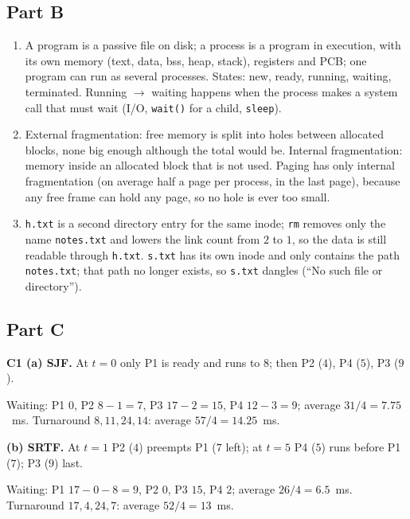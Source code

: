 \documentclass[11pt,a4paper]{article}
\newcommand{\cmd}[1]{\texttt{#1}}
\begin{document}
\subsection*{Part B}
\begin{enumerate}[leftmargin=1.6em,label=B\arabic*.]
  \item A program is a passive file on disk; a process is a program in execution, with its own memory (text, data, bss, heap, stack), registers and PCB; one program can run as several processes. States: new, ready, running, waiting, terminated. Running $\to$ waiting happens when the process makes a system call that must wait (I/O, \cmd{wait()} for a child, \cmd{sleep}).
  \item External fragmentation: free memory is split into holes between allocated blocks, none big enough although the total would be. Internal fragmentation: memory inside an allocated block that is not used. Paging has only internal fragmentation (on average half a page per process, in the last page), because any free frame can hold any page, so no hole is ever too small.
  \item \texttt{h.txt} is a second directory entry for the same inode; \cmd{rm} removes only the name \texttt{notes.txt} and lowers the link count from $2$ to $1$, so the data is still readable through \texttt{h.txt}. \texttt{s.txt} has its own inode and only contains the path \texttt{notes.txt}; that path no longer exists, so \texttt{s.txt} dangles (``No such file or directory'').
\end{enumerate}

\subsection*{Part C}
\textbf{C1 (a) SJF.} At $t=0$ only P1 is ready and runs to $8$; then P2 ($4$), P4 ($5$), P3 ($9$).
\begin{center}\end{center}
Waiting: P1 $0$, P2 $8-1 = 7$, P3 $17-2 = 15$, P4 $12-3 = 9$; average $31/4 = 7.75$~ms. Turnaround $8, 11, 24, 14$: average $57/4 = 14.25$~ms.

\textbf{(b) SRTF.} At $t=1$ P2 ($4$) preempts P1 ($7$ left); at $t=5$ P4 ($5$) runs before P1 ($7$); P3 ($9$) last.
\begin{center}\end{center}
Waiting: P1 $17-0-8 = 9$, P2 $0$, P3 $15$, P4 $2$; average $26/4 = 6.5$~ms. Turnaround $17, 4, 24, 7$: average $52/4 = 13$~ms.
\end{document}
